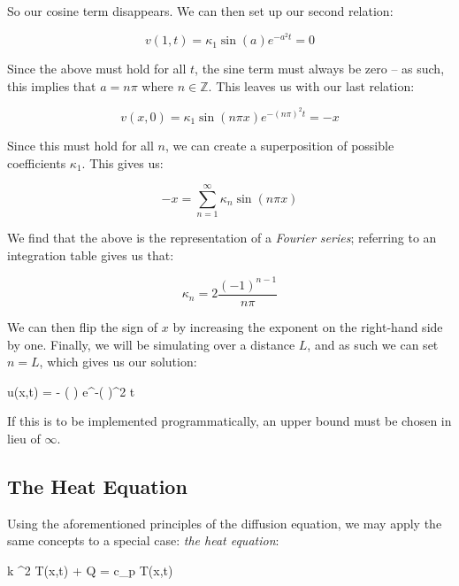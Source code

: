 \documentclass[a4paper,10pt,english]{article}
\newenvironment{boxequation}{
\begin{tcolorbox}[ams equation, enhanced, colback=black!50!green!10!white, colframe=black, fuzzy shadow={0mm}{-4pt}{-0.5pt}{0.4mm}{black!60!white}]}
{\end{tcolorbox}}
\begin{document}
So our cosine term disappears.  We can then set up our second relation:

\begin{equation*}
v(1,t) = \kappa_1 \sin( a ) e^{-a^2 t} = 0
\end{equation*}

Since the above must hold for all $t$, the sine term must always be zero – as such, this implies that $a = n\pi$ where $n \in \mathbb{Z}$.  This leaves us with our last relation:

\begin{equation*}
v(x,0) = \kappa_1 \sin( n \pi x ) e^{-(n \pi)^2 t} = -x
\end{equation*}

Since this must hold for all $n$, we can create a superposition of possible coefficients $\kappa_1$.  This gives us:

\begin{equation*}
-x = \sum_{n=1}^{\infty} \kappa_n \sin(n \pi x)
\end{equation*}

We find that the above is the representation of a \textit{Fourier series}; referring to an integration table \cite{rottmann} gives us that:

\begin{equation*}
\kappa_n = 2\frac{(-1)^{n-1}}{n \pi}
\end{equation*}

We can then flip the sign of $x$ by increasing the exponent on the right-hand side by one.  Finally, we will be simulating over a distance $L$, and as such we can set $n = L$, which gives us our solution:

\begin{boxequation}
\label{eq_analytical}
u(x,t) = - \sin \left(  \right) e^{-\left(  \right)^2 t}
\end{boxequation}

If this is to be implemented programmatically, an upper bound must be chosen in lieu of $\infty$.

\subsection*{The Heat Equation}

Using the aforementioned principles of the diffusion equation, we may apply the same concepts to a special case: \textit{the heat equation}:

\begin{boxequation}
\label{eq_heat}
k \nabla^2 T(x,t) + Q = \rho c_p  T(x,t)
\end{boxequation}
\end{document}
